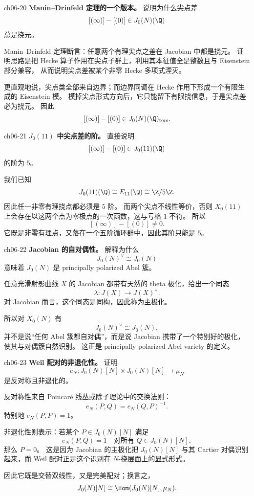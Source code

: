 \begin{problem}{ch06-20}
\textbf{Manin--Drinfeld 定理的一个版本。}
说明为什么尖点差
\[
[(\infty)]-[(0)]\in J_0(N)(\Q)
\]
总是挠元。
\end{problem}
\begin{solution}
Manin--Drinfeld 定理断言：任意两个有理尖点之差在 Jacobian 中都是挠元。
证明思路是把 Hecke 算子作用在尖点子群上，利用其本征值全是整数且与 Eisenstein 部分兼容，
从而说明尖点差被某个非零 Hecke 多项式湮灭。

更直观地说，尖点类全部来自边界；而边界同调在 Hecke 作用下形成一个有限生成的 Eisenstein 模。
模掉尖点形式方向后，它只能留下有限挠信息，于是尖点差必为挠元。
因此
\[
[(\infty)]-[(0)]\in J_0(N)(\Q)_{\mathrm{tors}}.
\]
\end{solution}

\begin{problem}{ch06-21}
\textbf{$J_0(11)$ 中尖点差的阶。}
直接说明
\[
[(\infty)]-[(0)]\in J_0(11)(\Q)
\]
的阶为 $5$。
\end{problem}
\begin{solution}
我们已知
\[
J_0(11)(\Q)\cong E_{11}(\Q)\cong \Z/5\Z.
\]
因此任一非零有理挠点都必须是 $5$ 阶。
而两个尖点不线性等价，否则 $X_0(11)$ 上会存在以这两个点为零极点的一次函数，这与亏格 $1$ 不符。
所以
\[
[(\infty)]-[(0)]\neq 0.
\]
它既是非零有理点，又落在一个五阶循环群中，因此其阶只能是 $5$。
\end{solution}

\begin{problem}{ch06-22}
\textbf{Jacobian 的自对偶性。}
解释为什么
\[
J_0(N)^\vee\cong J_0(N)
\]
意味着 $J_0(N)$ 是 principally polarized Abel 簇。
\end{problem}
\begin{solution}
任意光滑射影曲线 $X$ 的 Jacobian 都带有天然的 theta 极化，给出一个同态
\[
\lambda:J(X)\to J(X)^\vee.
\]
对 Jacobian 而言，这个同态是同构，因此称为主极化。

所以对 $X_0(N)$ 有
\[
J_0(N)^\vee\cong J_0(N),
\]
并不是说“任何 Abel 簇都自对偶”，而是说 Jacobian 携带了一个特别好的极化，使其与对偶簇自然识别。
这正是 principally polarized Abel variety 的定义。
\end{solution}

\begin{problem}{ch06-23}
\textbf{Weil 配对的非退化性。}
证明
\[
e_N:J_0(N)[N]\times J_0(N)[N]\to \mu_N
\]
是反对称且非退化的。
\end{problem}
\begin{solution}
反对称性来自 Poincar\'e 线丛或除子理论中的交换法则：
\[
e_N(P,Q)=e_N(Q,P)^{-1}.
\]
特别地 $e_N(P,P)=1$。

非退化性则表示：若某个 $P\in J_0(N)[N]$ 满足
\[
e_N(P,Q)=1\quad\text{对所有 }Q\in J_0(N)[N],
\]
那么 $P=0$。
这是因为 Jacobian 的主极化把 $J_0(N)[N]$ 与其 Cartier 对偶识别起来，而 Weil 配对正是这个识别在 $N$-挠层面上的显式形式。

因此它既是交替双线性，又是完美配对；换言之，
\[
J_0(N)[N]\cong \Hom(J_0(N)[N],\mu_N).
\]
\end{solution}

